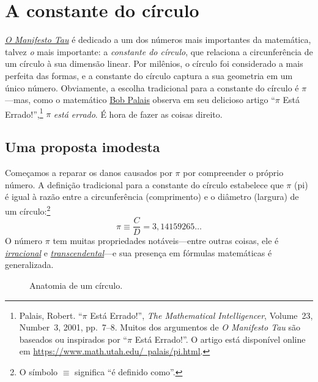 \newcommand{\fixme}[1]{\underline{#1}}

\section{A constante do círculo} %
\label{sec:the_circle_constant}

\href{https://tauday.com/tau-manifesto}{\emph{O Manifesto Tau}} é dedicado a um dos números mais importantes da matemática, talvez \emph{o} mais importante: a \emph{constante do círculo}, que relaciona a circunferência de um círculo à sua dimensão linear. Por milênios, o círculo foi considerado a mais perfeita das formas, e a constante do círculo captura a sua geometria em um único número. Obviamente, a escolha tradicional para a constante do círculo é $\pi$---mas, como o matemático \href{https://www.math.utah.edu/~palais/}{Bob Palais} observa em seu delicioso artigo ``$\pi$ Está Errado!'',\footnote{Palais, Robert. ``$\pi$ Está Errado!'', \emph{The Mathematical Intelligencer}, Volume~23, Number~3, 2001, pp.~7--8. Muitos dos argumentos de \emph{O Manifesto Tau} são baseados ou inspirados por ``$\pi$ Está Errado!''. O artigo está disponível online em \href{https://www.math.utah.edu/~palais/pi.html}{https://www.math.utah.edu/~palais/pi.html}.} $\pi$ \emph{está errado}. É hora de fazer as coisas direito.

  \subsection{Uma proposta imodesta} %
  \label{sec:an_immodest_proposal}

Começamos a reparar os danos causados ​​por $\pi$ por compreender o próprio número. A definição tradicional para a constante do círculo estabelece que $\pi$ (pi) é igual à razão entre a circunferência (comprimento) e o diâmetro (largura) de um círculo:\footnote{O símbolo $\equiv$ significa ``é definido como''.}
\begin{equation}
\label{eq:pi}
\pi \equiv \frac{C}{D} = 3,14159265\ldots
\end{equation}
O número $\pi$ tem muitas propriedades notáveis---entre outras coisas, ele é \href{https://pt.wikipedia.org/wiki/N%C3%BAmero_irracional}{\emph{irracional}} e \href{https://pt.wikipedia.org/wiki/N%C3%BAmero_transcendente}{\emph{transcendental}}---e sua presença em fórmulas matemáticas é generalizada.

\begin{figure}
\caption{Anatomia de um círculo.\label{fig:circle}}
\end{figure}

